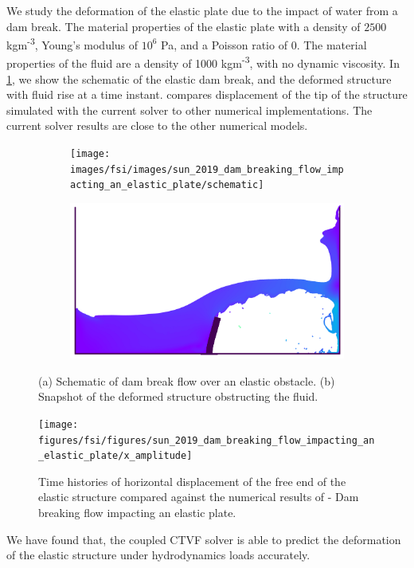We study the deformation of the elastic plate due to the impact of water from a
dam break. The material properties of the elastic plate with a density of $2500$
kgm\textsuperscript{-3}, Young's modulus of $10^6$ Pa, and a Poisson ratio of
$0$. The material properties of the fluid are a density of 1000
kgm\textsuperscript{-3}, with no dynamic viscosity. In
\cref{fig:dam-breaking-onto-plate-snapshot}, we show the schematic of the
elastic dam break, and the deformed structure with fluid rise at a time instant.
 compares displacement of
the tip of the structure simulated with the current solver to other numerical
implementations. The current solver results are close to the other numerical
models.
\begin{figure}[tpb]
    \centering
  \begin{subfigure}{0.48\textwidth}
    \centering
    \texttt{[image: images/fsi/images/sun\_2019\_dam\_breaking\_flow\_impacting\_an\_elastic\_plate/schematic]}
    \caption{}
  \end{subfigure}
  \begin{subfigure}{0.48\textwidth}
    \centering
        \includegraphics[scale=0.4]{figures/fsi/figures/sun_2019_dam_breaking_flow_impacting_an_elastic_plate/snap_t_2.png}
        \caption{}
  \end{subfigure}
    \caption
    { (a) Schematic of dam break flow over an elastic obstacle. (b) Snapshot of
      the deformed structure obstructing the fluid. }
    \label{fig:dam-breaking-onto-plate-snapshot}
\end{figure}
\begin{figure}[tpb]
  \centering
  \texttt{[image: figures/fsi/figures/sun\_2019\_dam\_breaking\_flow\_impacting\_an\_elastic\_plate/x\_amplitude]}
  \caption{Time histories of horizontal displacement of the free end of the
    elastic structure compared against the numerical results of
    \citep{sun2019fully,bogaers2016evaluation}- Dam breaking flow impacting an
    elastic plate.}
\label{fig:water-impact-plate-deflection-quantitative}
\end{figure}
We have found that, the coupled CTVF solver is able to predict the deformation of the elastic
structure under hydrodynamics loads accurately.
